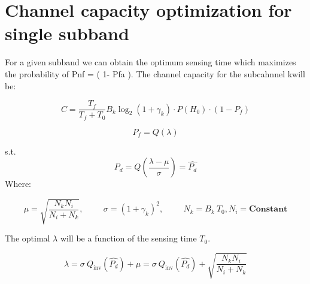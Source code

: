 \documentclass[a4paper,10pt]{article}
\title{}
\author{}
\begin{document}
\maketitle

\begin{abstract}

\end{abstract}

\section{Channel capacity optimization for single subband}
 
 
 
 For a given subband we can obtain the optimum sensing time which
  maximizes the probability of Pnf = ( 1- Pfa ).
 The channel capacity for the subcahnnel kwill be:
 
 
 $$ C = \frac{T_f}{T_f + T_0}B_k \log_2(1+ \gamma_k ) \cdot P(H_0) \cdot  (1- P_{f}) $$
 


 
 $$ P_f = Q(\lambda) $$
 
 s.t. $$ P_d = Q{ \left( \frac{\lambda - \mu }{\sigma}  \right) } =
 \hat{P_d} $$
 Where:
 
 \begin{equation}
   \mu = \sqrt{ \frac{N_k N_i }{N_i + N_k}  }, \hspace{1cm}  
   \sigma = (1 + \gamma_k)^2,  
   \hspace{1cm} N_k = B_k \ T_0, N_i = \textbf{Constant}   
 \end{equation}
  
The optimal $\lambda$ will be a function of the sensing time $T_0$.


 \begin{equation}
  \lambda        =
 \sigma \  Q_\textrm{inv}   ( \hat{P_d}   )    +  \mu  =  
   \sigma \  Q_\textrm{inv}   ( \hat{P_d}   )    + \sqrt{ \frac{N_k N_i }{N_i + N_k}  }
\end{equation}
 
\end{document}
